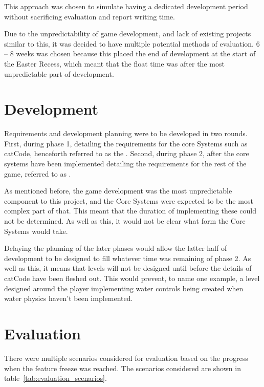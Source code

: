 This approach was chosen to simulate having a dedicated development period without sacrificing evaluation and report writing time. 

Due to the unpredictability of game development, and lack of existing projects similar to this, it was decided to have multiple potential methods of evaluation. 6 -- 8 weeks was chosen because this placed the end of development at the start of the Easter Recess, which meant that the float time was after the most unpredictable part of development.

\section{Development}\label{sec:methodology/development}

Requirements and development planning were to be developed in two rounds. First, during phase 1, detailing the requirements for the core Systems such as catCode, henceforth referred to as the . Second, during phase 2, after the core systems have been implemented detailing the requirements for the rest of the game, referred to as .

As mentioned before, the game development was the most unpredictable component to this project, and the Core Systems were expected to be the most complex part of that. This meant that the duration of implementing these could not be determined. As well as this, it would not be clear what form the Core Systems would take.

\pagebreak %

Delaying the planning of the later phases would allow the latter half of development to be designed to fill whatever time was remaining of phase 2. As well as this, it means that levels will not be designed until before the details of catCode have been fleshed out. This would prevent, to name one example, a level designed around the player implementing water controls being created when water physics haven't been implemented.

\section{Evaluation}\label{sec:methodology/evaluation}

There were multiple scenarios considered for evaluation based on the progress when the feature freeze was reached. The scenarios considered are shown in table~\ref{tab:evaluation_scenarios}.

